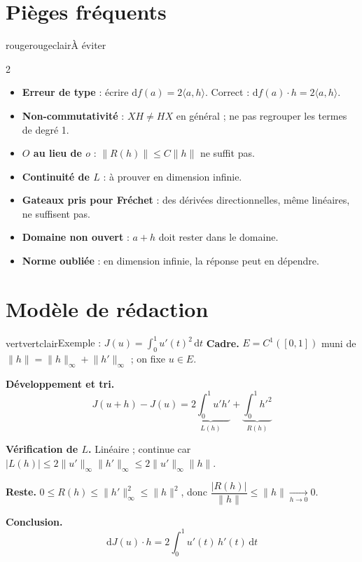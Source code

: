 \documentclass[10pt,a4paper]{article}
\newcommand{\norm}[1]{\lVert #1\rVert}
\newcommand{\abs}[1]{\lvert #1\rvert}
\newcommand{\diff}{\mathrm{d}}
\begin{document}
\section{Pièges fréquents}

\begin{boite}{rouge}{rougeclair}{À éviter}
\begin{multicols}{2}
\begin{itemize}[leftmargin=1.1em]
\item \textbf{Erreur de type} : écrire $\diff f(a)=2\langle a,h\rangle$. Correct : $\diff f(a)\cdot h=2\langle a,h\rangle$.
\item \textbf{Non-commutativité} : $XH\neq HX$ en général ; ne pas regrouper les termes de degré 1.
\item \textbf{$O$ au lieu de $o$} : $\norm{R(h)}\le C\norm{h}$ ne suffit pas.
\item \textbf{Continuité de $L$} : à prouver en dimension infinie.
\item \textbf{Gateaux pris pour Fréchet} : des dérivées directionnelles, même linéaires, ne suffisent pas.
\item \textbf{Domaine non ouvert} : $a+h$ doit rester dans le domaine.
\item \textbf{Norme oubliée} : en dimension infinie, la réponse peut en dépendre.
\end{itemize}
\end{multicols}
\end{boite}

\section{Modèle de rédaction}

\begin{boite}{vert}{vertclair}{Exemple : $J(u)=\displaystyle\int_0^1 u'(t)^2\,\diff t$}
\textbf{\sffamily Cadre.} $E=C^1([0,1])$ muni de $\norm{h}=\norm{h}_\infty+\norm{h'}_\infty$ ; on fixe $u\in E$.

\textbf{\sffamily Développement et tri.}
\[
J(u+h)-J(u)=\underbrace{2\int_0^1 u'h'}_{L(h)}+\underbrace{\int_0^1 h'^2}_{R(h)}
\]

\textbf{\sffamily Vérification de $L$.} Linéaire ; continue car
$\abs{L(h)}\le2\norm{u'}_\infty\norm{h'}_\infty\le2\norm{u'}_\infty\norm{h}$.

\textbf{\sffamily Reste.}
$0\le R(h)\le\norm{h'}_\infty^2\le\norm{h}^2$, donc $\dfrac{\abs{R(h)}}{\norm{h}}\le\norm{h}\xrightarrow[h\to0]{}0$.

\textbf{\sffamily Conclusion.}
\[
\boxed{\;\diff J(u)\cdot h=2\int_0^1 u'(t)\,h'(t)\,\diff t\;}
\]
\end{boite}
\end{document}
